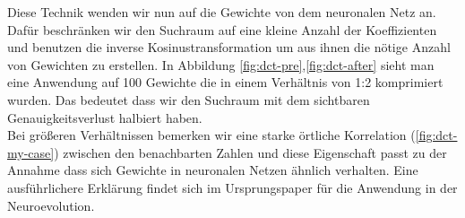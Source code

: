             Diese Technik wenden wir nun auf die Gewichte von dem neuronalen Netz an. Dafür beschränken wir den Suchraum auf eine kleine Anzahl der Koeffizienten und benutzen die inverse Kosinustransformation um aus ihnen die nötige Anzahl von Gewichten zu erstellen. In Abbildung \ref{fig:dct-pre},\ref{fig:dct-after} sieht man eine Anwendung auf 100 Gewichte die in einem Verhältnis von 1:2 komprimiert wurden. Das bedeutet dass wir den Suchraum mit dem sichtbaren Genauigkeitsverlust halbiert haben.\\

            \noindent
            Bei größeren Verhältnissen bemerken wir eine starke örtliche Korrelation (\ref{fig:dct-my-case}) zwischen den benachbarten Zahlen und diese Eigenschaft passt zu der Annahme dass sich Gewichte in neuronalen Netzen ähnlich verhalten. Eine ausführlichere Erklärung findet sich im Ursprungspaper für die Anwendung in der Neuroevolution.\cite{cosyne1}
